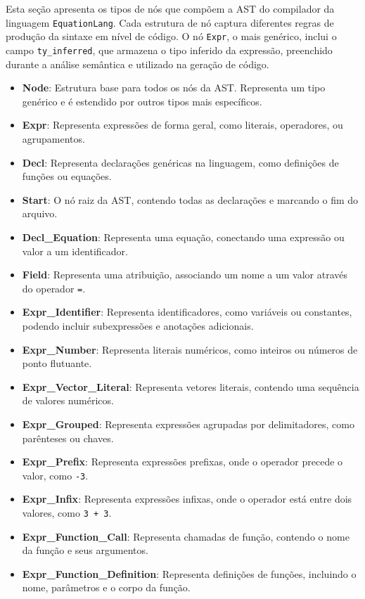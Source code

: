 Esta seção apresenta os tipos de nós que compõem a AST do compilador da linguagem \texttt{EquationLang}. Cada estrutura de nó captura diferentes regras de produção da sintaxe em nível de código. O nó \texttt{Expr}, o mais genérico, inclui o campo \verb"ty_inferred", que armazena o tipo inferido da expressão, preenchido durante a análise semântica e utilizado na geração de código.

\begin{itemize}
\item \textbf{Node}: Estrutura base para todos os nós da AST. Representa um tipo genérico e é estendido por outros tipos mais específicos.

\item \textbf{Expr}: Representa expressões de forma geral, como literais, operadores, ou agrupamentos.

\item \textbf{Decl}: Representa declarações genéricas na linguagem, como definições de funções ou equações.

\item \textbf{Start}: O nó raiz da AST, contendo todas as declarações e marcando o fim do arquivo.

\item \textbf{Decl\_Equation}: Representa uma equação, conectando uma expressão ou valor a um identificador.

\item \textbf{Field}: Representa uma atribuição, associando um nome a um valor através do operador \texttt{=}.

\item \textbf{Expr\_Identifier}: Representa identificadores, como variáveis ou constantes, podendo incluir subexpressões e anotações adicionais.

\item \textbf{Expr\_Number}: Representa literais numéricos, como inteiros ou números de ponto flutuante.

\item \textbf{Expr\_Vector\_Literal}: Representa vetores literais, contendo uma sequência de valores numéricos.

\item \textbf{Expr\_Grouped}: Representa expressões agrupadas por delimitadores, como parênteses ou chaves.

\item \textbf{Expr\_Prefix}: Representa expressões prefixas, onde o operador precede o valor, como \texttt{-3}.

\item \textbf{Expr\_Infix}: Representa expressões infixas, onde o operador está entre dois valores, como \texttt{3 + 3}.

\item \textbf{Expr\_Function\_Call}: Representa chamadas de função, contendo o nome da função e seus argumentos.

\item \textbf{Expr\_Function\_Definition}: Representa definições de funções, incluindo o nome, parâmetros e o corpo da função.
\end{itemize}

